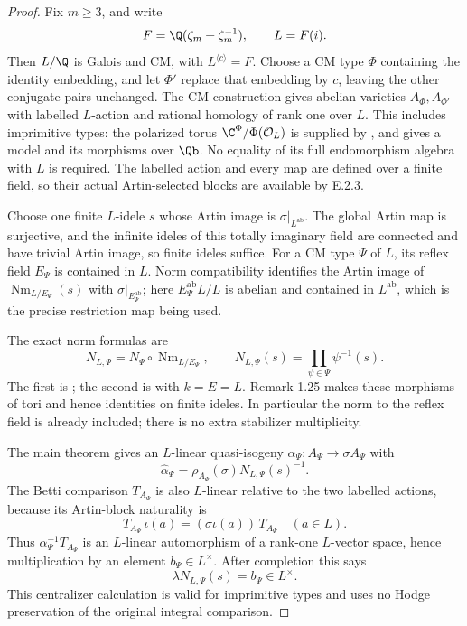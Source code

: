 \begin{proof}
Fix \(m\ge3\), and write
\[
 F=\Q(\zeta_m+\zeta_m^{-1}),\qquad L=F(i).
\]
Then \(L/\Q\) is Galois and CM, with \(L^{\langle c\rangle}=F\).
Choose a CM type \(\Phi\) containing the identity embedding,
and let \(\Phi'\) replace that embedding by \(c\), leaving
the other conjugate pairs unchanged. The CM construction
gives abelian varieties \(A_\Phi,A_{\Phi'}\) with labelled
\(L\)-action and rational homology of rank one over \(L\).
This includes imprimitive types: the polarized torus
\(\C^\Phi/\Phi(\mathcal O_L)\) is supplied by
\cite[Example 2.11]{GenMilneCM2020}, and
\cite[Proposition 7.9 and Corollary 7.10,
pp.~54--55]{GenMilneCM2020} gives a model and its morphisms
over \(\Qb\). No equality of its full endomorphism algebra
with \(L\) is required. The labelled action and every
map are defined over a finite field, so their actual
Artin-selected blocks are available by E.2.3.

Choose one finite \(L\)-idele \(s\) whose Artin image is
\(\sigma|_{L^{\mathrm{ab}}}\). The global Artin map is
surjective, and the infinite ideles of this totally
imaginary field are connected and have trivial Artin
image, so finite ideles suffice.
For a CM type \(\Psi\) of \(L\), its reflex field
\(E_\Psi\) is contained in \(L\). Norm compatibility
identifies the Artin image of
\(\operatorname{Nm}_{L/E_\Psi}(s)\) with
\(\sigma|_{E_\Psi^{\mathrm{ab}}}\); here
\(E_\Psi^{\mathrm{ab}}L/L\) is abelian and contained
in \(L^{\mathrm{ab}}\), which is the precise
restriction map being used.

The exact norm formulas are
\[
 N_{L,\Psi}
  =N_\Psi\circ\operatorname{Nm}_{L/E_\Psi},
 \qquad
 N_{L,\Psi}(s)=\prod_{\psi\in\Psi}\psi^{-1}(s).
 \tag{E.2.20c}
\]
The first is \cite[Proposition 1.23, p.~16]{GenMilneCM2020};
the second is \cite[Proposition 1.26, p.~17]{GenMilneCM2020}
with \(k=E=L\). Remark 1.25 makes these morphisms of
tori and hence identities on finite ideles.
In particular the norm to the reflex field is already
included; there is no extra stabilizer multiplicity.

The main theorem gives an \(L\)-linear quasi-isogeny
\(\alpha_\Psi:A_\Psi\to\sigma A_\Psi\) with
\[
 \widehat\alpha_\Psi
     =\rho_{A_\Psi}(\sigma)N_{L,\Psi}(s)^{-1}.
\]
The Betti comparison \(T_{A_\Psi}\) is also \(L\)-linear
relative to the two labelled actions, because its
Artin-block naturality is
\[
 T_{A_\Psi}\,\iota(a)=(\sigma\iota(a))\,T_{A_\Psi}
 \quad(a\in L).
\]
Thus \(\alpha_\Psi^{-1}T_{A_\Psi}\) is an \(L\)-linear
automorphism of a rank-one \(L\)-vector space, hence
multiplication by an element \(b_\Psi\in L^\times\).
After completion this says
\[
 \lambda N_{L,\Psi}(s)=b_\Psi\in L^\times.
 \tag{E.2.20d}
\]
This centralizer calculation is valid for imprimitive
types and uses no Hodge preservation of the original
integral comparison.


\end{proof}
